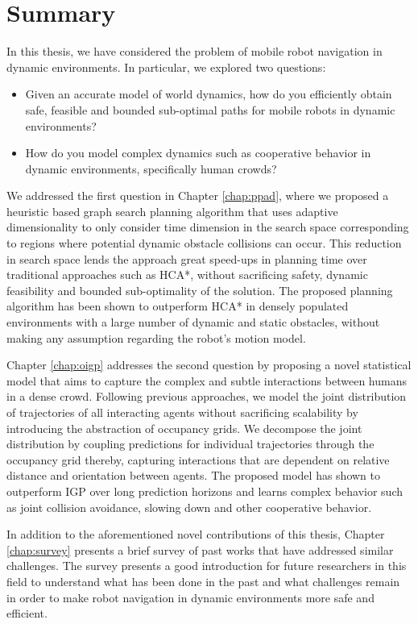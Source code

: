 \section{Summary}
\label{sec:conclusion-summary}

In this thesis, we have considered the problem of mobile robot navigation in dynamic environments. In particular, we explored two questions:
\begin{itemize}
\item Given an accurate model of world dynamics, how do you efficiently obtain safe, feasible and bounded sub-optimal paths for mobile robots in dynamic environments?
\item How do you model complex dynamics such as cooperative behavior in dynamic environments, specifically human crowds?
\end{itemize}

We addressed the first question in Chapter \ref{chap:ppad}, where we proposed a heuristic based graph search planning algorithm that uses adaptive dimensionality to only consider time dimension in the search space corresponding to regions where potential dynamic obstacle collisions can occur. This reduction in search space lends the approach great speed-ups in planning time over traditional approaches such as HCA*, without sacrificing safety, dynamic feasibility and bounded sub-optimality of the solution. The proposed planning algorithm has been shown to outperform HCA* in densely populated environments with a large number of dynamic and static obstacles, without making any assumption regarding the robot's motion model.

Chapter \ref{chap:oigp} addresses the second question by proposing a novel statistical model that aims to capture the complex and subtle interactions between humans in a dense crowd. Following previous approaches, we model the joint distribution of trajectories of all interacting agents without sacrificing scalability by introducing the abstraction of occupancy grids. We decompose the joint distribution by coupling predictions for individual trajectories through the occupancy grid thereby, capturing interactions that are dependent on relative distance and orientation between agents. The proposed model has shown to outperform IGP over long prediction horizons and learns complex behavior such as joint collision avoidance, slowing down and other cooperative behavior.

In addition to the aforementioned novel contributions of this thesis, Chapter \ref{chap:survey} presents a brief survey of past works that have addressed similar challenges. The survey presents a good introduction for future researchers in this field to understand what has been done in the past and what challenges remain in order to make robot navigation in dynamic environments more safe and efficient.

